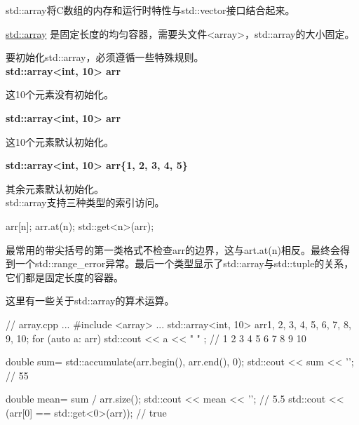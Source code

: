 

std::array将C数组的内存和运行时特性与std::vector接口结合起来。

\href{http://en.cppreference.com/w/cpp/container/array}{std::array} 是固定长度的均匀容器，需要头文件<array>，std::array的大小固定。

要初始化std::array，必须遵循一些特殊规则。\\

\noindent
\textbf{std::array<int, 10> arr}

这10个元素没有初始化。

\noindent
\textbf{std::array<int, 10> arr{}}

这10个元素默认初始化。

\noindent
\textbf{std::array<int, 10> arr\{1, 2, 3, 4, 5\}}

其余元素默认初始化。\\

std::array支持三种类型的索引访问。

\begin{cpp}
arr[n];
arr.at(n);
std::get<n>(arr);
\end{cpp}

最常用的带尖括号的第一类格式不检查arr的边界，这与art.at(n)相反。最终会得到一个std::range\_error异常。最后一个类型显示了std::array与std::tuple的关系，它们都是固定长度的容器。

这里有一些关于std::array的算术运算。


\begin{cpp}
// array.cpp
...
#include <array>
...
std::array<int, 10> arr{1, 2, 3, 4, 5, 6, 7, 8, 9, 10};
for (auto a: arr) std::cout << a << " " ; // 1 2 3 4 5 6 7 8 9 10

double sum= std::accumulate(arr.begin(), arr.end(), 0);
std::cout << sum << '\n'; // 55

double mean= sum / arr.size();
std::cout << mean << '\n'; // 5.5
std::cout << (arr[0] == std::get<0>(arr)); // true
\end{cpp}




















